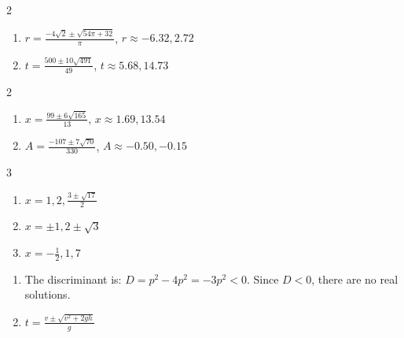 \documentclass{ximera}
\begin{document}
\begin{multicols}{2}
\begin{enumerate}
\setcounter{enumi}{\value{HW}}
\item $r = \frac{-4\sqrt{2} \pm \sqrt{54\pi + 32}}{\pi}$, $r \approx -6.32, 2.72$
\item $t = \frac{500 \pm 10\sqrt{491}}{49}$, $t \approx 5.68, 14.73$


\setcounter{HW}{\value{enumi}}
\end{enumerate}
\end{multicols}

\begin{multicols}{2}
\begin{enumerate}
\setcounter{enumi}{\value{HW}}

\item $x = \frac{99 \pm 6 \sqrt{165}}{13}$, $x \approx 1.69, 13.54$
\item $A = \frac{-107 \pm 7 \sqrt{70}}{330}$, $A \approx -0.50, -0.15$

\setcounter{HW}{\value{enumi}}
\end{enumerate}
\end{multicols}







\begin{multicols}{3}
\begin{enumerate}
\setcounter{enumi}{\value{HW}}

\item $x = 1, 2, \frac{3 \pm \sqrt{17}}{2}$
\item $x = \pm 1, 2 \pm \sqrt{3}$ 
\item $x = -\frac{1}{2}, 1, 7$

\setcounter{HW}{\value{enumi}}
\end{enumerate}
\end{multicols}

\begin{enumerate}
\setcounter{enumi}{\value{HW}}

\item The discriminant is: $D = p^2 - 4p^2 = -3p^2 < 0$.  Since $D < 0$, there are no real solutions.  

\item $t = \frac{v \pm \sqrt{v^2 + 2gh}}{g}$

\setcounter{HW}{\value{enumi}}
\end{enumerate}
\end{document}
